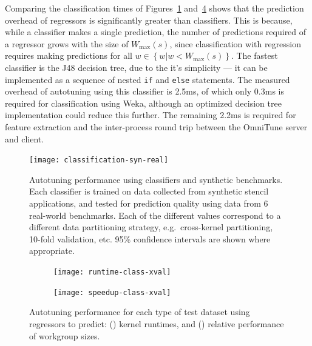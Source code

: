 Comparing the classification times of Figures~\ref{fig:class-syn}
and~\ref{fig:regression-class} shows that the prediction overhead of
regressors is significantly greater than classifiers. This is because,
while a classifier makes a single prediction, the number of
predictions required of a regressor grows with the size of
$W_{\max}(s)$, since classification with regression requires making
predictions for all $w \in \left\{ w | w < W_{\max}(s) \right\}$. The
fastest classifier is the J48 decision tree, due to the it's
simplicity --- it can be implemented as a sequence of nested
\texttt{if} and \texttt{else} statements. The measured overhead of
autotuning using this classifier is 2.5ms, of which only 0.3ms is
required for classification using Weka, although an optimized decision
tree implementation could reduce this further. The remaining 2.2ms is
required for feature extraction and the inter-process round trip
between the OmniTune server and client.

\begin{figure}
\centering
\texttt{[image: classification-syn-real]}
\vspace{-.7em}
\caption{%
  Autotuning performance using classifiers and synthetic benchmarks. Each
  classifier is trained on data collected from synthetic stencil
  applications, and tested for prediction quality using data from 6
  real-world benchmarks. Each of the different values correspond to a
  different data partitioning strategy, e.g.\ cross-kernel
  partitioning, 10-fold validation, etc. 95\% confidence intervals are
  shown where appropriate.
}
\label{fig:class-syn}
\end{figure}

\begin{figure}
\centering
\begin{subfigure}[h]{.28\columnwidth}
\centering
\texttt{[image: runtime-class-xval]}
\vspace{-2em}
\caption{}
\label{fig:runtime-class-xval}
\end{subfigure}
\begin{subfigure}[h]{.28\columnwidth}
\centering
\texttt{[image: speedup-class-xval]}
\vspace{-2em}
\caption{}
\label{fig:speedup-class-xval}
\end{subfigure}
\vspace{-.5em}
\caption{%
  Autotuning performance for each type of test dataset using
  regressors to predict: () kernel
  runtimes, and () relative performance
  of workgroup sizes.%
}
\label{fig:regression-class}
\end{figure}


